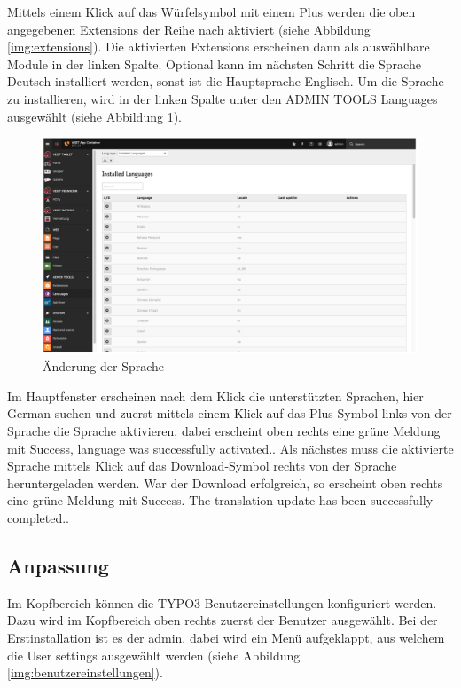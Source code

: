 Mittels einem Klick auf das Würfelsymbol mit einem Plus werden die oben angegebenen Extensions der Reihe nach aktiviert (siehe Abbildung \ref{img:extensions}). Die aktivierten Extensions erscheinen dann als auswählbare Module in der linken Spalte.
Optional kann im nächsten Schritt die Sprache Deutsch installiert werden, sonst ist die Hauptsprache Englisch. Um die Sprache zu installieren, wird in der linken Spalte unter den ADMIN TOOLS \glqq Languages\grqq{} ausgewählt (siehe Abbildung \ref{img:sprache_aendern}).

\begin{figure}[ht!]
\centering
\includegraphics[width=12cm]{Figures/paula/typo3/sprache_aendern.png}
\caption{Änderung der Sprache}
\label{img:sprache_aendern}
\end{figure}

Im Hauptfenster erscheinen nach dem Klick die unterstützten Sprachen, hier \glqq German\grqq{} suchen und zuerst mittels einem Klick auf das Plus-Symbol links von der Sprache die Sprache aktivieren, dabei erscheint oben rechts eine grüne Meldung mit \glqq Success, language was successfully activated.\grqq{}. Als nächstes muss die aktivierte Sprache mittels Klick auf das Download-Symbol rechts von der Sprache heruntergeladen werden. War der Download erfolgreich, so erscheint oben rechts eine grüne Meldung mit \glqq Success. The translation update has been successfully completed.\grqq{}.

\subsection{Anpassung}

Im Kopfbereich können die TYPO3-Benutzereinstellungen konfiguriert werden. Dazu wird im Kopfbereich oben rechts zuerst der Benutzer ausgewählt. Bei der Erstinstallation ist es der \glqq admin\grqq{}, dabei wird ein Menü aufgeklappt, aus welchem die \glqq User settings\grqq{} ausgewählt werden (siehe Abbildung \ref{img:benutzereinstellungen}).

